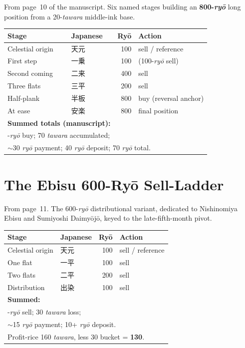 \documentclass[10pt, openany]{book}
\newcommand{\jp}[1]{{\japanesefont #1}}
\begin{document}
From page~10 of the manuscript. Six named stages building an
\textbf{800-\textit{ry\=o}} long position from a 20-\textit{tawara}
middle-ink base.

\begin{center}
\begin{tabular}{@{}l l r l@{}}
\toprule
\textbf{Stage} & \textbf{Japanese} & \textbf{Ry\=o} & \textbf{Action}\\
\midrule
Celestial origin  & \jp{天元}        & 100   & sell / reference\\
First step        & \jp{一乗}        & 100   & (100-\textit{ry\=o} sell)\\
Second coming     & \jp{二来}        & 400   & sell\\
Three flats       & \jp{三平}        & 200   & sell\\
Half-plank        & \jp{半板}        & 800   & buy (reversal anchor)\\
At ease           & \jp{安楽}        & 800   & final position\\
\midrule
\multicolumn{2}{l}{\textbf{Summed totals (manuscript):}} & & \\
\multicolumn{4}{l}{\quad 800-\textit{ry\=o} buy; 70 \textit{tawara} accumulated;}\\
\multicolumn{4}{l}{\quad ${\sim}$30 \textit{ry\=o} payment; 40 \textit{ry\=o} deposit; 70 \textit{ry\=o} total.}\\
\bottomrule
\end{tabular}
\end{center}


\section{The Ebisu 600-Ry\=o Sell-Ladder}

From page~11. The 600-\textit{ry\=o} distributional variant,
dedicated to Nishinomiya Ebisu and Sumiyoshi Daimy\=oj\=o,
keyed to the late-fifth-month pivot.

\begin{center}
\begin{tabular}{@{}l l r l@{}}
\toprule
\textbf{Stage} & \textbf{Japanese} & \textbf{Ry\=o} & \textbf{Action}\\
\midrule
Celestial origin  & \jp{天元}        & 100   & sell / reference\\
One flat          & \jp{一平}        & 100   & sell\\
Two flats         & \jp{二平}        & 200   & sell\\
Distribution      & \jp{出染}        & 100   & sell\\
\midrule
\multicolumn{2}{l}{\textbf{Summed:}} &     & \\
\multicolumn{4}{l}{\quad 400-\textit{ry\=o} sell; 30 \textit{tawara} loss;}\\
\multicolumn{4}{l}{\quad ${\sim}$15 \textit{ry\=o} payment; 10+ \textit{ry\=o} deposit.}\\
\multicolumn{4}{l}{\quad Profit-rice 160 \textit{tawara}, less 30 bucket = \textbf{130}.}\\
\bottomrule
\end{tabular}
\end{center}
\end{document}
